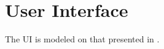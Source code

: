 \chapter{User Interface}
\label{ch:user-interface}

The UI is modeled on that presented in \cite{guerin2012passive}.

